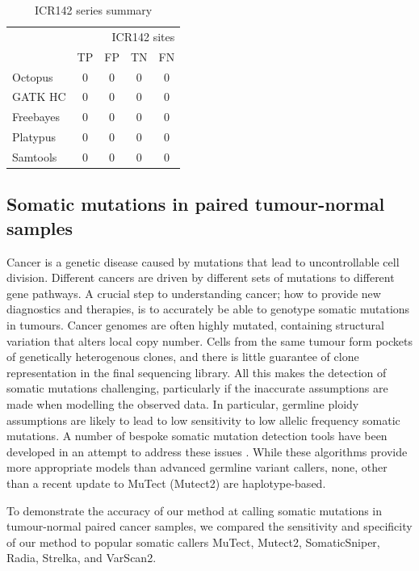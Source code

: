 \documentclass[notitlepage, twocolumn]{article}
\begin{document}
\begin{table}[h]
\centering
\caption{ICR142 series summary}
\begin{tabular}{lcccc}
\hline
\multicolumn{5}{r}{ICR142 sites} \\
\cline{2-5} & TP & FP & TN & FN \\
\hline
Octopus & 0 & 0 & 0 & 0 \\
GATK HC & 0 & 0 & 0 & 0 \\
Freebayes & 0 & 0 & 0 & 0 \\
Platypus & 0 & 0 & 0 & 0 \\
Samtools & 0 & 0 & 0 & 0 \\
\hline
\end{tabular}
\end{table}

\subsection*{Somatic mutations in paired tumour-normal samples}

Cancer is a genetic disease caused by mutations that lead to uncontrollable cell division. Different cancers are driven by different sets of mutations to different gene pathways. A crucial step to understanding cancer; how to provide new diagnostics and therapies, is to accurately be able to genotype somatic mutations in tumours. Cancer genomes are often highly mutated, containing structural variation that alters local copy number. Cells from the same tumour form pockets of genetically heterogenous clones, and there is little guarantee of clone representation in the final sequencing library. All this makes the detection of somatic mutations challenging, particularly if the inaccurate assumptions are made when modelling the observed data. In particular, germline ploidy assumptions are likely to lead to low sensitivity to low allelic frequency somatic mutations. A number of bespoke somatic mutation detection tools have been developed in an attempt to address these issues \cite{RN142, RN146, RN150, RN143, RN145}. While these algorithms provide more appropriate models than advanced germline variant callers, none, other than a recent update to MuTect (Mutect2) are haplotype-based.

To demonstrate the accuracy of our method at calling somatic mutations in tumour-normal paired cancer samples, we compared the sensitivity and specificity of our method to popular somatic callers MuTect, Mutect2, SomaticSniper, Radia, Strelka, and VarScan2.
\end{document}
